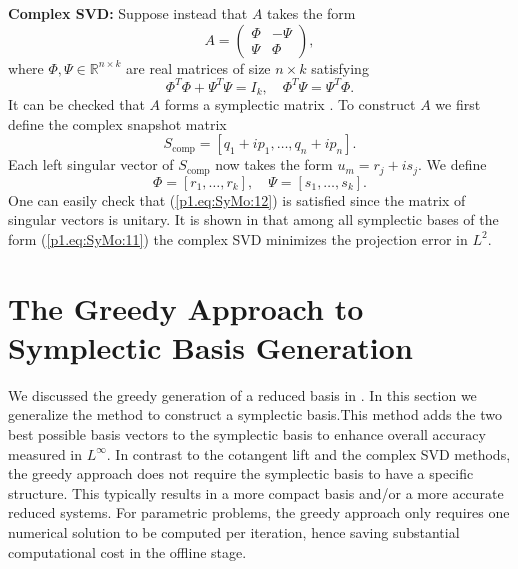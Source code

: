 {\bf Complex SVD:} Suppose instead that $A$ takes the form 
\begin{equation} \label{p1.eq:SyMo:11}
	A = 
	\begin{pmatrix}
		\Phi & -\Psi \\
		\Psi & \Phi
	\end{pmatrix},
\end{equation}
where $\Phi,\Psi\in \mathbb R^{n\times k}$ are real matrices of size $n\times k$ satisfying
\begin{equation} \label{p1.eq:SyMo:12}
\Phi^T \Phi + \Psi^T \Psi = I_k,\quad \Phi^T \Psi = \Psi^T \Phi.
\end{equation}
It can be checked that $A$ forms a symplectic matrix \cite{marsden2013introduction}. To construct $A$ we first define the complex snapshot matrix
\begin{equation} \label{p1.eq:SyMo:13}
	S_{\text{comp}} = [ q_1 + i p_1, \dots , q_n + i p_n ].
\end{equation}
Each left singular vector of $S_{\text{comp}}$ now takes the form $u_m = r_j + i s_j$. We define
\begin{equation} \label{p1.eq:SyMo:14}
	 \Phi = [r_1,\dots, r_k], \quad \Psi = [s_1,\dots, s_k].
\end{equation}
One can easily check that (\ref{p1.eq:SyMo:12}) is satisfied since the matrix of singular vectors is unitary. It is shown in \cite{doi:10.1137/140978922} that among all symplectic bases of the form (\ref{p1.eq:SyMo:11}) the complex SVD minimizes the projection error in $L^2$.


\section{The Greedy Approach to Symplectic Basis Generation} \label{p1.sec:Symo.PrSy:3} We discussed the greedy generation of a reduced basis in . In this section we generalize the method to construct a symplectic basis.This method adds the two best possible basis vectors to the symplectic basis to enhance overall accuracy measured in $L^\infty$. In contrast to the cotangent lift and the complex SVD methods, the greedy approach does not require the symplectic basis to have a specific structure. This typically results in a more compact basis and/or a more accurate reduced systems. For parametric problems, the greedy approach only requires one numerical solution to be computed per iteration, hence saving substantial computational cost in the offline stage. 

